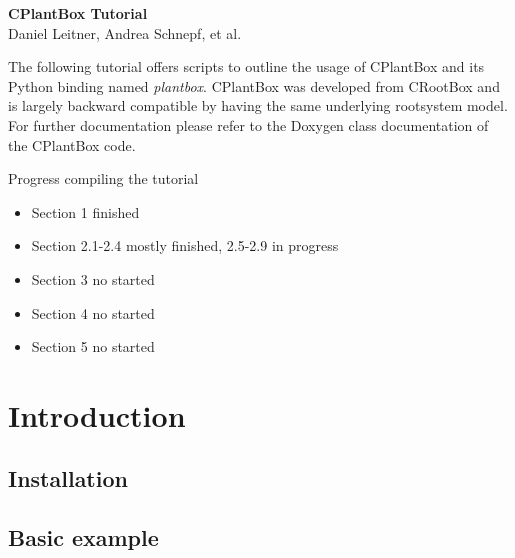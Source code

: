 \documentclass[a4paper]{article}
\begin{document}
\begin{center}
\vspace{0.5 cm}
\huge{\textbf{CPlantBox Tutorial}} \\
\vspace{0.5 cm}
\normalsize
Daniel Leitner, Andrea Schnepf, et al. \\
\end{center}

\vspace{0.5 cm}

\noindent 
The following tutorial offers scripts to outline the usage of CPlantBox \citep{zhou2020cplantbox} and its Python binding named \emph{plantbox}. CPlantBox was developed from CRootBox \citep{schnepf2018crootbox} and is largely backward compatible by having the same underlying rootsystem model. For further documentation please refer to the Doxygen class documentation of the CPlantBox code.
 

\vspace{0.5 cm}

\tableofcontents

\newpage 

Progress compiling the tutorial

\begin{itemize}
 \item Section 1 finished
 \item Section 2.1-2.4 mostly finished, 2.5-2.9 in progress
 \item Section 3 no started
 \item Section 4 no started
 \item Section 5 no started 
\end{itemize}




\newpage
\section{Introduction} \label{sec:introduction}

\subsection{Installation} \label{ssec:intro_installation}


\subsection{Basic example} \label{ssec:intro_basic}

\end{document}
